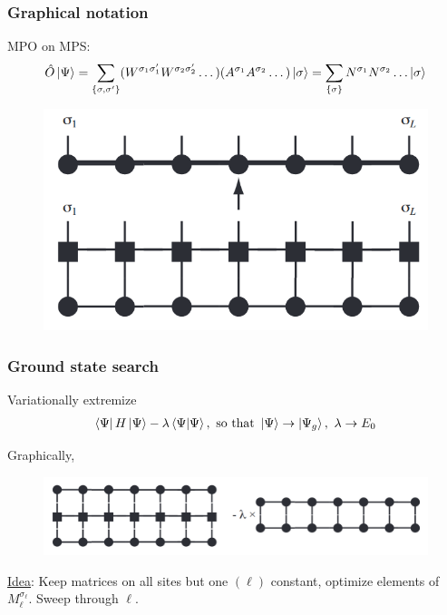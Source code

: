 \documentclass{beamer}
\theoremstyle{definition}
\begin{document}
\begin{frame}
	\frametitle{Graphical notation}
	MPO on MPS:
	\begin{align*}
		\hat{O}\ket{\Psi} 
		= \sum_{\{\sigma,\sigma'\}} (W^{\sigma_1\sigma_1'}W^{\sigma_2\sigma_2'}\dots)(A^{\sigma_1}A^{\sigma_2}\dots) \ket{\sigma} 
		= \sum_{\{\sigma\}} N^{\sigma_1}N^{\sigma_2}\dots \ket{\sigma}
 	\end{align*}
 	\begin{figure}[!htb]
 		\centering
 		\includegraphics[scale=0.3]{mpo_on_mps.png}
 	\end{figure}
\end{frame}




\begin{frame}
	\frametitle{Ground state search}
	Variationally extremize 
	\begin{align*}
		\bra{\Psi} H \ket{\Psi} - \lambda \braket{\Psi}, \text{ so that }  \ket{\Psi} \to \ket{\Psi_g},\,\, \lambda \to E_0
	\end{align*}

	
	\vspace{10pt}
	
	\pause
	
	Graphically,
	\begin{figure}[!htb]
		\centering
		\includegraphics[scale=0.3]{gnd_state_search.png}
	\end{figure}
	\underline{Idea}: Keep matrices on all sites but one $(\ell)$ constant, optimize elements of $M^{\sigma_\ell}_{\ell}$. Sweep through $\ell$.
\end{frame}
\end{document}

